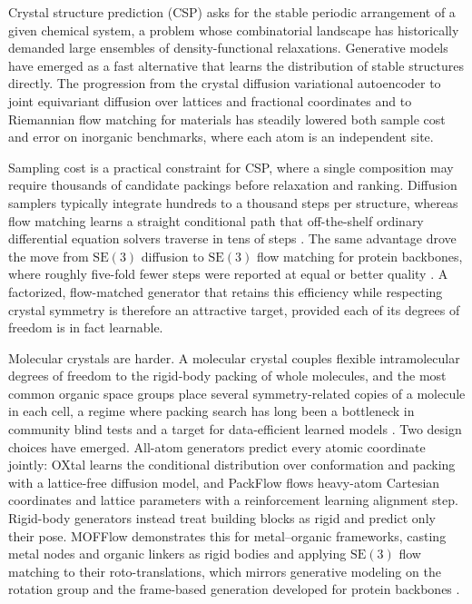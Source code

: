 \documentclass[10pt]{article}
\begin{document}
Crystal structure prediction (CSP) asks for the stable periodic arrangement of
a given chemical system, a problem whose combinatorial landscape has
historically demanded large ensembles of density-functional relaxations.
Generative models have emerged as a fast alternative that learns the
distribution of stable structures directly. The progression from the crystal
diffusion variational autoencoder \citep{xie2022cdvae} to joint equivariant
diffusion over lattices and fractional coordinates \citep{jiao2023diffcsp} and to
Riemannian flow matching for materials \citep{miller2024flowmm} has steadily
lowered both sample cost and error on inorganic benchmarks, where each atom is
an independent site.

Sampling cost is a practical constraint for CSP, where a single composition may
require thousands of candidate packings before relaxation and ranking. Diffusion
samplers typically integrate hundreds to a thousand steps per structure, whereas
flow matching learns a straight conditional path that off-the-shelf ordinary
differential equation solvers traverse in tens of
steps \citep{lipman2023flowmatching,chen2024riemannian}. The same advantage drove
the move from $\mathrm{SE}(3)$ diffusion to $\mathrm{SE}(3)$ flow matching for
protein backbones, where roughly five-fold fewer steps were reported at equal or
better quality \citep{yim2023se3diffusion,yim2023frameflow}. A factorized,
flow-matched generator that retains this efficiency while respecting crystal
symmetry is therefore an attractive target, provided each of its degrees of
freedom is in fact learnable.

Molecular crystals are harder. A molecular crystal couples flexible
intramolecular degrees of freedom to the rigid-body packing of whole molecules,
and the most common organic space groups place several symmetry-related copies
of a molecule in each cell, a regime where packing search has long been a
bottleneck in community blind tests \citep{price2023blindtest7} and a target for
data-efficient learned models \citep{obrien2021dataefficient}. Two design choices
have emerged. All-atom
generators predict every atomic coordinate jointly: OXtal \citep{jin2025oxtal}
learns the conditional distribution over conformation and packing with a
lattice-free diffusion model, and PackFlow \citep{subramanian2026packflow} flows
heavy-atom Cartesian coordinates and lattice parameters with a reinforcement
learning alignment step. Rigid-body generators instead treat building blocks as
rigid and predict only their pose. MOFFlow \citep{kim2025mofflow} demonstrates
this for metal--organic frameworks, casting metal nodes and organic linkers as
rigid bodies and applying $\mathrm{SE}(3)$ flow matching to their
roto-translations, which mirrors generative modeling on the rotation
group \citep{leach2022so3} and the frame-based generation developed for protein
backbones \citep{yim2023se3diffusion,yim2023frameflow}.
\end{document}
